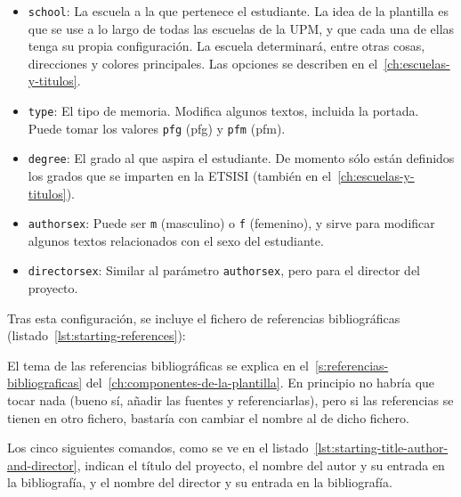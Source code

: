 \begin{itemize}
    \item \texttt{school}: La escuela a la que pertenece el estudiante. La idea de la plantilla es que se use a lo largo de todas las escuelas de la UPM, y que cada una de ellas tenga su propia configuración. La escuela determinará, entre otras cosas, direcciones y colores principales. Las opciones se describen en el~\autoref{ch:escuelas-y-titulos}.
    \item \texttt{type}: El tipo de memoria. Modifica algunos textos, incluida la portada. Puede tomar los valores \texttt{pfg} (\acrlong{pfg}) y \texttt{pfm}  (\acrlong{pfm}).
    \item \texttt{degree}: El grado al que aspira el estudiante. De momento sólo están definidos los grados que se imparten en la ETSISI (también en el~\autoref{ch:escuelas-y-titulos}).
    \item \texttt{authorsex}: Puede ser \texttt{m} (masculino) o \texttt{f} (femenino), y sirve para modificar algunos textos relacionados con el sexo del estudiante.
    \item \texttt{directorsex}: Similar al parámetro \texttt{authorsex}, pero para el director del proyecto.
\end{itemize}

Tras esta configuración, se incluye el fichero de referencias bibliográficas (listado~\ref{lst:starting-references}):



El tema de las referencias bibliográficas se explica en el~\autoref{s:referencias-bibliograficas} del~\autoref{ch:componentes-de-la-plantilla}. En principio no habría que tocar nada (bueno sí, añadir las fuentes y referenciarlas), pero si las referencias se tienen en otro fichero, bastaría con cambiar el nombre al de dicho fichero.

Los cinco siguientes comandos, como se ve en el listado~\ref{lst:starting-title-author-and-director}, indican el título del proyecto, el nombre del autor y su entrada en la bibliografía, y el nombre del director y su entrada en la bibliografía.



